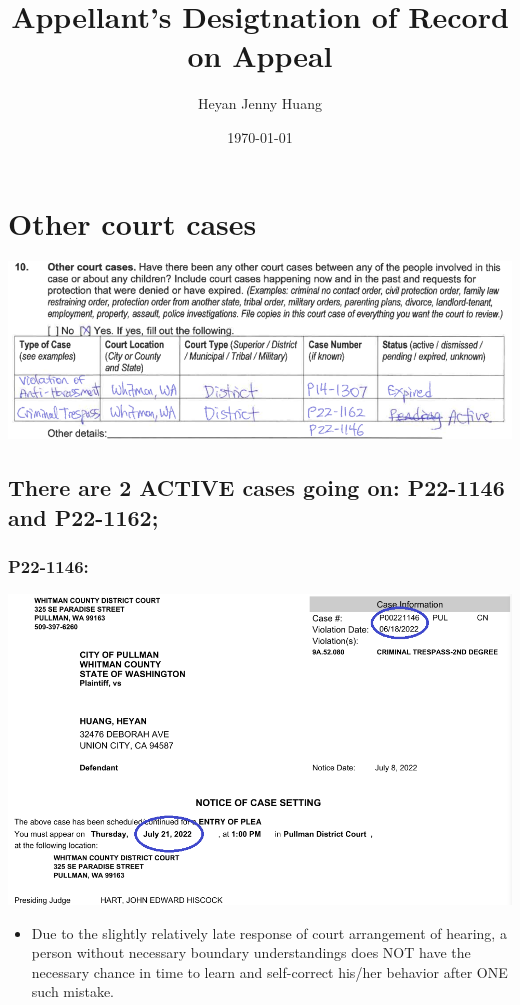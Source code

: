 \documentclass[9pt, b5paper]{article}
\author{Heyan Jenny Huang}
\date{\today}
\title{Appellant's Desigtnation of Record on Appeal}
\begin{document}
\maketitle
\tableofcontents


\section{Other court cases}
\label{sec-1}

\includegraphics[width=.9\linewidth]{./pic/dearCousin_20220919_153339.png}
\subsection{There are 2 ACTIVE cases going on: \textbf{P22-1146} and \textbf{P22-1162};}
\label{sec-1-1}
\subsubsection{\textbf{P22-1146:}}
\label{sec-1-1-1}

\includegraphics[width=.9\linewidth]{./pic/dearCousin_20220919_185022.png}
\begin{itemize}
\item Due to the slightly relatively late response of court arrangement of hearing, a person without necessary boundary understandings does NOT have the necessary chance in time to learn and self-correct his/her behavior after ONE such mistake.
\end{itemize}
\end{document}
